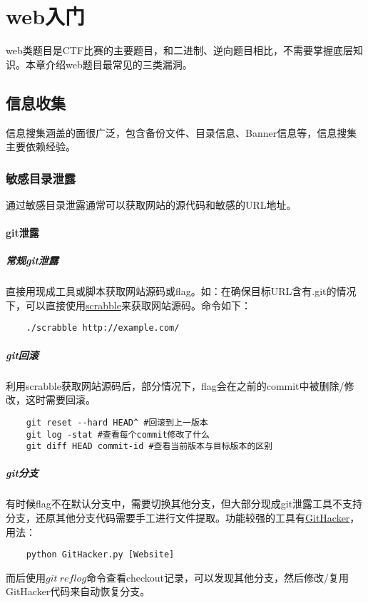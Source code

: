 \chapter{web入门}
web类题目是CTF比赛的主要题目，和二进制、逆向题目相比，不需要掌握底层知识。本章介绍web题目最常见的三类漏洞。


\section{信息收集}
信息搜集涵盖的面很广泛，包含备份文件、目录信息、Banner信息等，信息搜集主要依赖经验。


\subsection{敏感目录泄露}
通过敏感目录泄露通常可以获取网站的源代码和敏感的URL地址。
\subsubsection*{git泄露}

\paragraph*{常规git泄露}
直接用现成工具或脚本获取网站源码或flag。如：在确保目标URL含有.git的情况下，可以直接使用\href{https://github.com/denny0223/scrabble}{scrabble}来获取网站源码。命令如下：
\begin{lstlisting}
    ./scrabble http://example.com/
\end{lstlisting}

\paragraph*{git回滚}
利用scrabble获取网站源码后，部分情况下，flag会在之前的commit中被删除/修改，这时需要回滚。
\begin{lstlisting}
    git reset --hard HEAD^ #回滚到上一版本
    git log -stat #查看每个commit修改了什么
    git diff HEAD commit-id #查看当前版本与目标版本的区别
\end{lstlisting}

\paragraph*{git分支}
有时候flag不在默认分支中，需要切换其他分支，但大部分现成git泄露工具不支持分支，还原其他分支代码需要手工进行文件提取。功能较强的工具有\href{https://github.com/WangYihang/GitHacker}{GitHacker}，用法：
\begin{lstlisting}
    python GitHacker.py [Website]
\end{lstlisting}
而后使用$git\ reflog$命令查看checkout记录，可以发现其他分支，然后修改/复用GitHacker代码来自动恢复分支。

